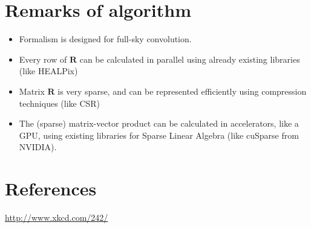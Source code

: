 \documentclass[11pt]{article}
\begin{document}
\section{Remarks of algorithm}

\begin{itemize}
	\item Formalism is designed for full-sky convolution.
	\item Every row of $\mathbf{R}$ can be calculated in parallel using already existing libraries (like HEALPix) 
	\item Matrix $\mathbf{R}$ is very sparse, and can be represented efficiently using compression techniques (like CSR)
	\item The (sparse) matrix-vector product can be calculated in accelerators, like a GPU, using existing libraries for Sparse Linear Algebra (like cuSparse from NVIDIA).
\end{itemize}
%
	
	
	\section*{References}
	
	\url{http://www.xkcd.com/242/}
	
\end{document}
